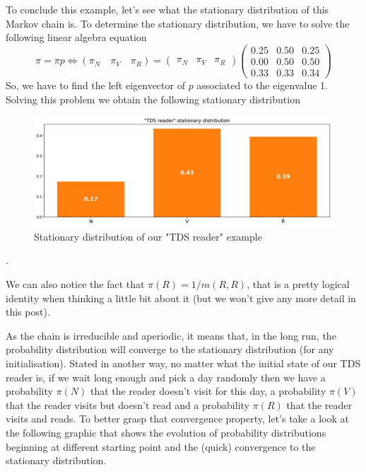 To conclude this example, let's see what the stationary distribution of this Markov chain is. To determine the stationary distribution, we have to solve the following linear algebra equation
\begin{equation}\pi=\pi p \Longleftrightarrow\left(\pi_{N} \quad \pi_{V} \quad \pi_{R}\right)=\left(\begin{array}{ccc}
\pi_{N} & \pi_{V} & \pi_{R}
\end{array}\right)\left(\begin{array}{ccc}
0.25 & 0.50 & 0.25 \\
0.00 & 0.50 & 0.50 \\
0.33 & 0.33 & 0.34
\end{array}\right)\end{equation}
So, we have to find the left eigenvector of $p$ associated to the eigenvalue 1. Solving this problem we obtain the following stationary distribution



\begin{figure}[h]
    \centering
\includegraphics[width=\textwidth]{pic/p05c06-snip08.png}
    \caption{Stationary distribution of our "TDS reader" example}
    \label{fig:p05c06-snip08}
\end{figure}


.

We can also notice the fact that $\pi(R) = 1/m(R,R)$, that is a pretty logical identity when thinking a little bit about it (but we won't give any more detail in this post).

As the chain is irreducible and aperiodic, it means that, in the long run, the probability distribution will converge to the stationary distribution (for any initialisation). Stated in another way, no matter what the initial state of our TDS reader is, if we wait long enough and pick a day randomly then we have a probability $\pi(N)$ that the reader doesn't visit for this day, a probability $\pi(V)$ that the reader visits but doesn't read and a probability $\pi(R)$ that the reader visits and reads. To better grasp that convergence property, let's take a look at the following graphic that shows the evolution of probability distributions beginning at different starting point and the (quick) convergence to the stationary distribution.


